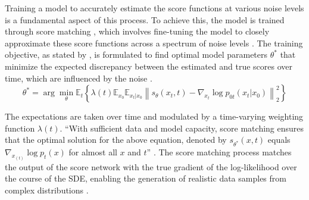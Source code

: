 Training a model to accurately estimate the score functions at various noise levels is a fundamental aspect of this process. To achieve this, the model is trained through score matching \citep{hyvarinenScoreMatching}, which involves fine-tuning the model to closely approximate these score functions across a spectrum of noise levels \citep{song2020score}. The training objective, as stated by \citeauthor{song2020score}, is formulated to find optimal model parameters \( \theta^* \) that minimize the expected discrepancy between the estimated and true scores  over time, which are influenced by the noise \citep{song2020score}.
\[
\theta^* = \arg\min_\theta \mathbb{E}_t \left\{ \lambda(t) \mathbb{E}_{x_0} \mathbb{E}_{x_t|x_0} \left\| s_\theta(x_t, t) - \nabla_{x_t} \log p_{0t}(x_t | x_0) \right\|_2^2 \right\}
\]

 The expectations are taken over time and modulated by a time-varying weighting function \( \lambda(t) \). ``With sufficient data and model capacity, score matching ensures that the optimal solution for the above equation, denoted by \(s_{\theta^*}(x, t)\) equals \(\nabla_{x_(t)} \log p_{t}(x)\) for almost all \( x \) and \( t \)'' \citep{song2020score}. The score matching process matches the output of the score network with the true gradient of the log-likelihood over the course of the SDE, enabling the generation of realistic data samples from complex distributions \citep{yangdiffusionSummary}.